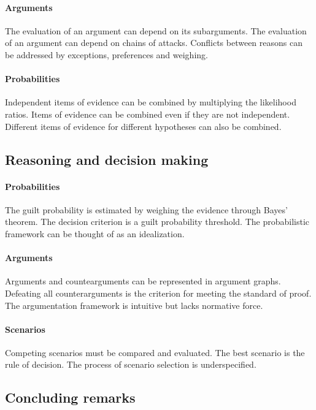 \documentclass[10pt]{article}
\begin{document}
\paragraph{Arguments}
	The evaluation of an argument can depend on its subarguments.
	The evaluation of an argument can depend on chains of attacks.
	Conflicts between reasons can be addressed by exceptions, preferences and weighing.
	
\paragraph{Probabilities}
	Independent items of evidence can be combined by multiplying the likelihood ratios.
	Items of evidence can be combined even if they are not independent.
	Different items of evidence for different hypotheses can also be combined.

\subsection{Reasoning and decision making}

\paragraph{Probabilities}
	The guilt probability is estimated by weighing  the evidence through Bayes' theorem.
	The decision criterion is a guilt probability threshold.
	The probabilistic framework can be thought of as an idealization.
	
\paragraph{Arguments}
	Arguments and countearguments can be represented in argument graphs.
	Defeating all counterarguments is the criterion for meeting the standard of proof.
	The argumentation framework is intuitive but lacks normative force.
	
\paragraph{Scenarios}
	Competing scenarios must be compared and evaluated.
	The best scenario is the rule of decision.
	The process of scenario selection is underspecified.
	
\subsection{Concluding remarks}
\end{document}
